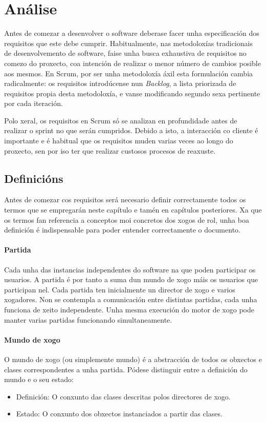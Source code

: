 \chapter{Análise}

Antes de comezar a desenvolver o software deberase facer unha especificación dos
requisitos que este debe cumprir. Habitualmente, nas metodoloxías tradicionais
de desenvolvemento de software, faise unha busca exhaustiva de requisitos no
comezo do proxecto, coa intención de realizar o menor número de cambios posible
aos mesmos. En Scrum, por ser unha metodoloxía áxil esta formulación cambia
radicalmente: os requisitos introdúcense nun {\it Backlog}, a lista priorizada
de requisitos propia desta metodoloxía, e vanse modificando segundo sexa
pertinente por cada iteración.
\par
Polo xeral, os requisitos en Scrum só se analizan en profundidade antes de
realizar o sprint no que serán cumpridos. Debido a isto, a interacción co
cliente é importante e é habitual que os requisitos muden varias veces ao longo
do proxecto, sen por iso ter que realizar custosos procesos de reaxuste.

\section{Definicións}
Antes de comezar cos requisitos será necesario definir correctamente todos os
termos que se empregarán neste capítulo e tamén en capítulos posteriores. Xa que
os termos fan referencia a conceptos moi concretos dos xogos de rol, unha boa
definición é indispensable para poder entender correctamente o documento. 

\subsubsection{Partida}
Cada unha das instancias independentes do software na que poden participar os
usuarios. A partida é por tanto a suma dun mundo de xogo máis os usuarios que
participan nel. Cada partida ten inicialmente un director de xogo e varios
xogadores. Non se contempla a comunicación entre distintas partidas, cada unha
funciona de xeito independente. Unha mesma execución do motor de xogo pode
manter varias partidas funcionando simultaneamente.

\subsubsection{Mundo de xogo}
O mundo de xogo (ou simplemente mundo) é a abstracción de todos os obxectos e
clases correspondentes a unha partida. Pódese distinguir entre a definición do
mundo e o seu estado:
\begin{itemize}
\item Definición: O conxunto das clases descritas polos directores de xogo.
\item Estado: O conxunto dos obxectos instanciados a partir das clases.
\end{itemize}


